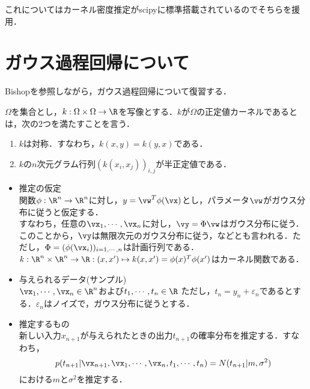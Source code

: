 \documentclass{jsarticle}
\begin{document}
これについてはカーネル密度推定がscipyに標準搭載されているのでそちらを援用．

\section{ガウス過程回帰について}

Bishopを参照\cite{bishop}しながら，ガウス過程回帰について復習する．

\begin{defi}
 $\Omega$を集合とし，$k:\Omega\times\Omega\to\R$を写像とする．$k$が$\Omega$の正定値カーネルであるとは，次の2つを満たすことを言う．
 \begin{enumerate}
  \item $k$は対称．すなわち，$k(x,y)=k(y,x)$である．
  \item $k$の$n$次元グラム行列$(k(x_i,x_j))_{i,j}$が半正定値である．
 \end{enumerate}
\end{defi}



\begin{itemize}
 \item 推定の仮定\\
       関数$\phi:\R^n\to\R^n$に対し，$y=\vw^T\phi(\vx)$とし，パラメータ$\vw$がガウス分布に従うと仮定する．\\
       すなわち，任意の$\vx_1,\cdots,\vx_n$に対し，$\vy=\Phi\vw$はガウス分布に従う．このことから，$\vy$は無限次元のガウス分布に従う，などとも言われる．ただし，$\Phi=(\phi(\vx_i))_{i=1,\cdots,n}$は計画行列である．
       $k:\R^n\times\R^n\to\R:(x,x')\mapsto k(x,x')=\phi(x)^T\phi(x')$はカーネル関数である．
 \item 与えられるデータ(サンプル)\\
       $\vx_1,\cdots,\vx_n\in\R^n$および$t_1,\cdots,t_n\in \R$
       ただし，$t_n=y_n+\varepsilon_n$であるとする．$\varepsilon_n$はノイズで，ガウス分布に従うとする．
 \item 推定するもの\\
       新しい入力$x_{n+1}$が与えられたときの出力$t_{n+1}$の確率分布を推定する．すなわち，
       \[
	p(t_{n+1}|\vx_{n+1},\vx_1,\cdots,\vx_n,t_1,\cdots,t_n)=N(t_{n+1}|m,\sigma^2)
       \]
       における$m$と$\sigma^2$を推定する．
\end{itemize}
\end{document}
